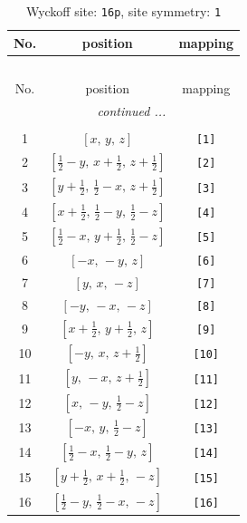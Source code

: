 \documentclass[fleqn,8pt]{jsarticle}
\begin{document}
\begin{longtable}{ccc}
\caption{Wyckoff site: {\tt 16p}, site symmetry: {\tt 1}}
 \\
 \hline \hline
No. & position & mapping \\ \hline \endfirsthead

\multicolumn{2}{l}{\tablename\ \thetable{}} \\
 \hline \hline
No. & position & mapping \\ \hline \endhead

 \hline \hline
\multicolumn{2}{r}{\footnotesize\it continued ...} \\ \endfoot

 \hline \hline
\multicolumn{2}{r}{} \\ \endlastfoot

1 & $\left[ x,\, y,\, z \right]$ & {\tt [1]} \\ \hline
2 & $\left[ \frac{1}{2} - y,\, x + \frac{1}{2},\, z + \frac{1}{2} \right]$ & {\tt [2]} \\ \hline
3 & $\left[ y + \frac{1}{2},\, \frac{1}{2} - x,\, z + \frac{1}{2} \right]$ & {\tt [3]} \\ \hline
4 & $\left[ x + \frac{1}{2},\, \frac{1}{2} - y,\, \frac{1}{2} - z \right]$ & {\tt [4]} \\ \hline
5 & $\left[ \frac{1}{2} - x,\, y + \frac{1}{2},\, \frac{1}{2} - z \right]$ & {\tt [5]} \\ \hline
6 & $\left[ - x,\, - y,\, z \right]$ & {\tt [6]} \\ \hline
7 & $\left[ y,\, x,\, - z \right]$ & {\tt [7]} \\ \hline
8 & $\left[ - y,\, - x,\, - z \right]$ & {\tt [8]} \\ \hline
9 & $\left[ x + \frac{1}{2},\, y + \frac{1}{2},\, z \right]$ & {\tt [9]} \\ \hline
10 & $\left[ - y,\, x,\, z + \frac{1}{2} \right]$ & {\tt [10]} \\ \hline
11 & $\left[ y,\, - x,\, z + \frac{1}{2} \right]$ & {\tt [11]} \\ \hline
12 & $\left[ x,\, - y,\, \frac{1}{2} - z \right]$ & {\tt [12]} \\ \hline
13 & $\left[ - x,\, y,\, \frac{1}{2} - z \right]$ & {\tt [13]} \\ \hline
14 & $\left[ \frac{1}{2} - x,\, \frac{1}{2} - y,\, z \right]$ & {\tt [14]} \\ \hline
15 & $\left[ y + \frac{1}{2},\, x + \frac{1}{2},\, - z \right]$ & {\tt [15]} \\ \hline
16 & $\left[ \frac{1}{2} - y,\, \frac{1}{2} - x,\, - z \right]$ & {\tt [16]} \\
\end{longtable}
\end{document}
